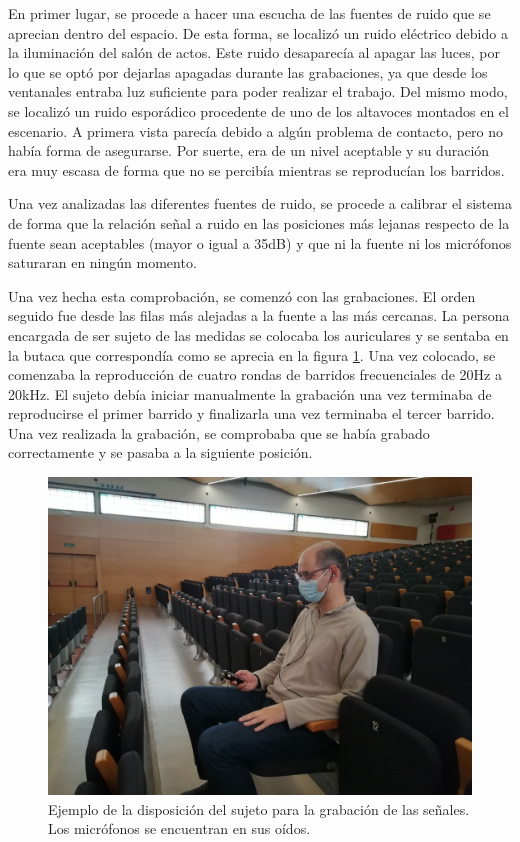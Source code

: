 \documentclass[11pt,a4paper,twoside]{book}
\begin{document}
            En primer lugar, se procede a hacer una escucha de las fuentes de ruido que se aprecian dentro del espacio. De esta forma, se localizó un ruido eléctrico debido a la iluminación del salón de actos. Este ruido desaparecía al apagar las luces, por lo que se optó por dejarlas apagadas durante las grabaciones, ya que desde los ventanales entraba luz suficiente para poder realizar el trabajo. Del mismo modo, se localizó un ruido esporádico procedente de uno de los altavoces montados en el escenario. A primera vista parecía debido a algún problema de contacto, pero no había forma de asegurarse. Por suerte, era de un nivel aceptable y su duración era muy escasa de forma que no se percibía mientras se reproducían los barridos.
                
            Una vez analizadas las diferentes fuentes de ruido, se procede a calibrar el sistema de forma que la relación señal a ruido en las posiciones más lejanas respecto de la fuente sean aceptables (mayor o igual a 35dB) y que ni la fuente ni los micrófonos saturaran en ningún momento.
                
            Una vez hecha esta comprobación, se comenzó con las grabaciones. El orden seguido fue desde las filas más alejadas a la fuente a las más cercanas. La persona encargada de ser sujeto de las medidas se colocaba los auriculares y se sentaba en la butaca que correspondía como se aprecia en la figura \ref{fig:Nico}. Una vez colocado, se comenzaba la reproducción de cuatro rondas de barridos frecuenciales de 20Hz a 20kHz. El sujeto debía iniciar manualmente la grabación una vez terminaba de reproducirse el primer barrido y finalizarla una vez terminaba el tercer barrido. Una vez realizada la grabación, se comprobaba que se había grabado correctamente y se pasaba a la siguiente posición. 
                
            \begin{figure}[H]
                \includegraphics[scale=0.3]{../imagenes/Nico.jpg}
                \centering
                \caption{Ejemplo de la disposición del sujeto para la grabación de las señales. Los micrófonos se encuentran en sus oídos.}
                \label{fig:Nico}
            \end{figure}
                
\end{document}
